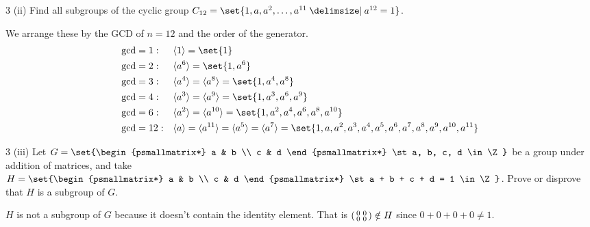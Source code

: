 \documentclass[11pt]{penrose}
\begin{document}
\begin{problem}{3 (ii)}
    Find all subgroups of the cyclic group $C_{12} = \set{1, a, a^2, \dots, a^{11} \st a^{12}=1}$.

    \solution We arrange these by the GCD of $n = 12$ and the order of the generator.
    \begin{equation*}
    \begin{aligned}
        \gcd &= 1:  & & \cyclic{1}   = \set{1}\\
        \gcd &= 2:  & & \cyclic{a^6} = \set{1, a^6}\\
        \gcd &= 3:  & & \cyclic{a^4} = \cyclic{a^8} = \set{1, a^4, a^8}\\
        \gcd &= 4:  & & \cyclic{a^3} = \cyclic{a^9} = \set{1, a^3, a^6, a^9}\\
        \gcd &= 6:  & & \cyclic{a^2} = \cyclic{a^{10}} = \set{1, a^2, a^4, a^6, a^8, a^{10}}\\
        \gcd &= 12: & & \cyclic{a}   = \cyclic{a^{11}} = \cyclic{a^5} = \cyclic{a^7} = \set{1, a, a^2, a^3, a^4, a^5, a^6, a^7, a^8, a^9, a^{10}, a^{11}}
    \end{aligned}
    \end{equation*}
\end{problem}

\begin{problem}{3 (iii)}
    Let $G = \set{\begin{psmallmatrix*} a & b \\ c & d \end{psmallmatrix*} \st a, b, c, d \in \Z}$ be a group under addition of matrices, and take $H = \set{\begin{psmallmatrix*} a & b \\ c & d \end{psmallmatrix*} \st a + b + c + d = 1 \in \Z}$. Prove or disprove that $H$ is a subgroup of $G$.

    \solution $H$ is not a subgroup of $G$ because it doesn't contain the identity element. That is $\begin{psmallmatrix*} 0 & 0 \\ 0 & 0 \end{psmallmatrix*} \notin H$ since $0 + 0 + 0 + 0  \neq 1$.
\end{problem}
\end{document}
